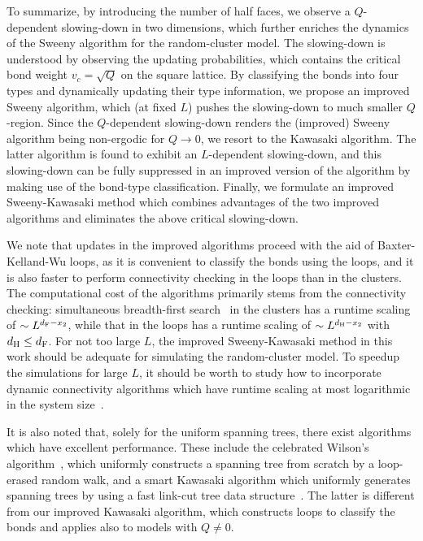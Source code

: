 \documentclass[aps,pre,twocolumn,superscriptaddress,longbibliography,floatfix]{revtex4-2}
\begin{document}
To summarize, by introducing the number of half faces, we observe a $Q$-dependent slowing-down in two dimensions, 
which further enriches the dynamics of the Sweeny algorithm for the random-cluster model.
The slowing-down is understood by observing the updating probabilities, which contains the critical bond weight $v_c=\sqrt{Q}$ on the square lattice.
By classifying the bonds into four types and dynamically updating their type information, we propose an improved Sweeny algorithm,
which (at fixed $L$) pushes the slowing-down to much smaller $Q$-region. 
Since the $Q$-dependent slowing-down renders the (improved) Sweeny algorithm being non-ergodic for $Q \rightarrow 0$,
we resort to the Kawasaki algorithm. 
The latter algorithm is found to exhibit an $L$-dependent slowing-down, and this slowing-down can be fully suppressed in an improved version of the algorithm by making use of the bond-type classification.
Finally, we formulate an improved Sweeny-Kawasaki method which combines advantages of the two improved algorithms and {eliminates the above} critical slowing-down.


We note that updates in the improved algorithms proceed with the aid of Baxter-Kelland-Wu loops,
as it is convenient to classify the bonds using the loops, and it is also faster to
perform connectivity checking in the loops than in the clusters.
The computational cost of the algorithms primarily stems from the connectivity checking:
simultaneous breadth-first search~\cite{deng2010some,elcci2013efficient} in the clusters has a runtime scaling of $\sim L^{d_{\rm F}-x_2}$,
while that in the loops has a runtime scaling of $\sim L^{d_{\rm H}-x_2}$ with $d_{\rm H} \leq d_{\rm F}$.
For not too large $L$, the improved Sweeny-Kawasaki method in this work should be adequate for simulating the random-cluster model.
To speedup the simulations for large $L$, it should be worth to study how to incorporate dynamic connectivity algorithms which have runtime scaling at most logarithmic in the system size~\cite{elcci2013efficient,elci2015algorithmic}.

It is also noted that, solely for the uniform spanning trees, there exist algorithms which have excellent performance. 
These include the celebrated Wilson's algorithm~\cite{wilson1996generating}, 
which uniformly constructs a spanning tree from scratch by a loop-erased random walk, 
and {a smart} Kawasaki algorithm {which uniformly generates spanning trees by using a fast link-cut tree data structure~\cite{russo_linking_2018}.
The latter is different from our improved Kawasaki algorithm, which constructs loops to classify the bonds and applies also to models with $Q \ne 0$.}
\end{document}
